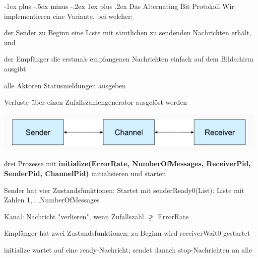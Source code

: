 \documentclass[10pt]{article}
\makeatletter
\renewcommand{\subsubsection}{\@startsection{subsubsection}{3}{0mm}%
                                {-1ex plus -.5ex minus -.2ex}%
                                {1ex plus .2ex}%
                                {\normalfont\small\bfseries}}
\makeatother
\begin{document}
\subsubsection{Das Alternating Bit Protokoll}
Wir implementieren eine Variante, bei welcher: 
\begin{itemize*}
  \item der Sender zu Beginn eine Liste mit sämtlichen zu sendenden Nachrichten erhält, und
  \item der Empfänger die erstmals empfangenen Nachrichten einfach auf dem Bildschirm ausgibt
  \item alle Aktoren Statusmeldungen ausgeben
  \item Verluste über einen Zufallszahlengenerator ausgelöst werden
\end{itemize*}
\begin{center}
  \includegraphics[width=0.4\linewidth]{Assets/Programmierparadigmen-alternate-bit-protokoll.png}
\end{center}
drei Prozesse mit \textbf{initialize(ErrorRate, NumberOfMessages, ReceiverPid, SenderPid, ChannelPid)} initialisieren und starten
\begin{itemize*}
  \item Sender hat vier Zustandsfunktionen; Startet mit senderReady0(List): Liste mit Zahlen 1,...,NumberOfMessages
  \item Kanal: Nachricht "verlieren", wenn Zufallszahl $\ngeq$ ErrorRate
  \item Empfänger hat zwei Zustandsfunktionen; zu Beginn wird receiverWait0 gestartet
  \item initialize wartet auf eine ready-Nachricht; sendet danach stop-Nachrichten an alle
\end{itemize*}
\end{document}
